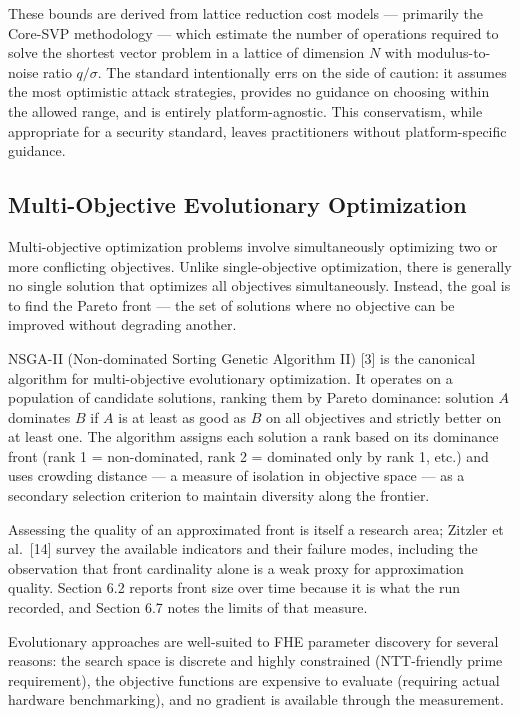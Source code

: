 These bounds are derived from lattice reduction cost models --- primarily the Core-SVP methodology --- which estimate the number of operations required to solve the shortest vector problem in a lattice of dimension \(N\) with modulus-to-noise ratio \(q/\sigma\). The standard intentionally errs on the side of caution: it assumes the most optimistic attack strategies, provides no guidance on choosing within the allowed range, and is entirely platform-agnostic. This conservatism, while appropriate for a security standard, leaves practitioners without platform-specific guidance.

\subsection{Multi-Objective Evolutionary Optimization}\label{multi-objective-evolutionary-optimization}

Multi-objective optimization problems involve simultaneously optimizing two or more conflicting objectives. Unlike single-objective optimization, there is generally no single solution that optimizes all objectives simultaneously. Instead, the goal is to find the Pareto front --- the set of solutions where no objective can be improved without degrading another.

NSGA-II (Non-dominated Sorting Genetic Algorithm II) [3] is the canonical algorithm for multi-objective evolutionary optimization. It operates on a population of candidate solutions, ranking them by Pareto dominance: solution \(A\) dominates \(B\) if \(A\) is at least as good as \(B\) on all objectives and strictly better on at least one. The algorithm assigns each solution a rank based on its dominance front (rank 1 = non-dominated, rank 2 = dominated only by rank 1, etc.) and uses crowding distance --- a measure of isolation in objective space --- as a secondary selection criterion to maintain diversity along the frontier.

Assessing the quality of an approximated front is itself a research area; Zitzler et al.~[14] survey the available indicators and their failure modes, including the observation that front cardinality alone is a weak proxy for approximation quality. Section 6.2 reports front size over time because it is what the run recorded, and Section 6.7 notes the limits of that measure.

Evolutionary approaches are well-suited to FHE parameter discovery for several reasons: the search space is discrete and highly constrained (NTT-friendly prime requirement), the objective functions are expensive to evaluate (requiring actual hardware benchmarking), and no gradient is available through the measurement.

